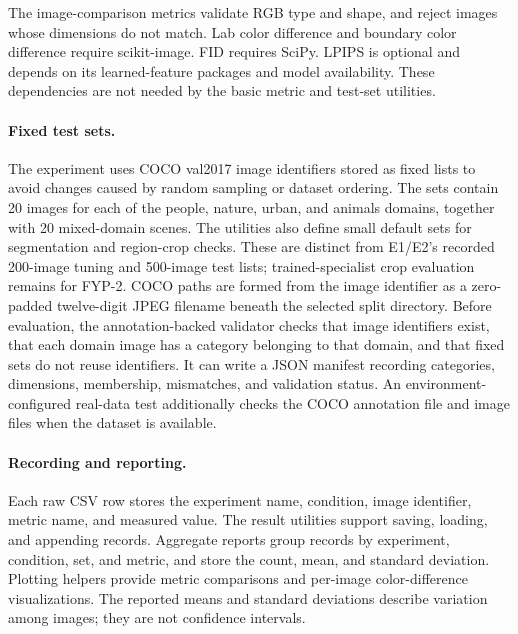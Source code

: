 \documentclass{FastFyp}
\begin{document}
The image-comparison metrics validate RGB type and shape, and reject images
whose dimensions do not match. Lab color difference and boundary color
difference require scikit-image. FID requires SciPy. LPIPS is optional and
depends on its learned-feature packages and model availability. These
dependencies are not needed by the basic metric and test-set utilities.

\paragraph{Fixed test sets.}
The experiment uses COCO val2017 image identifiers stored as fixed lists to
avoid changes caused by random sampling or dataset ordering. The sets contain
20 images for each of the people, nature, urban, and animals domains, together
with 20 mixed-domain scenes. The utilities also define small default sets for segmentation and region-crop checks. These are distinct from E1/E2's recorded 200-image tuning and 500-image test lists; trained-specialist crop evaluation remains for FYP-2. COCO paths are formed from the image
identifier as a zero-padded twelve-digit JPEG filename beneath the selected
split directory. Before evaluation, the annotation-backed validator checks
that image identifiers exist, that each domain image has a category belonging
to that domain, and that fixed sets do not reuse identifiers. It can write a
JSON manifest recording categories, dimensions, membership, mismatches, and
validation status. An environment-configured real-data test additionally
checks the COCO annotation file and image files when the dataset is available.

\paragraph{Recording and reporting.}
Each raw CSV row stores the experiment name, condition, image identifier,
metric name, and measured value. The result utilities support saving, loading,
and appending records. Aggregate reports group records by experiment,
condition, set, and metric, and store the count, mean, and standard deviation.
Plotting helpers provide metric comparisons and per-image color-difference
visualizations. The reported means and standard deviations describe variation
among images; they are not confidence intervals.
\end{document}
